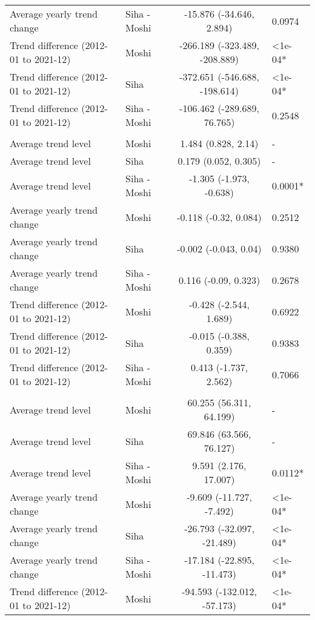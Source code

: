 \begin{longtable}{l|lcl}
Average yearly trend change & Siha - Moshi & -15.876 (-34.646, 2.894) & 0.0974 \\ 
Trend difference (2012-01 to 2021-12) & Moshi & -266.189 (-323.489, -208.889) & <1e-04* \\ 
Trend difference (2012-01 to 2021-12) & Siha & -372.651 (-546.688, -198.614) & <1e-04* \\ 
Trend difference (2012-01 to 2021-12) & Siha - Moshi & -106.462 (-289.689, 76.765) & 0.2548 \\ 
\midrule\addlinespace[2.5pt]
\multicolumn{4}{l}{Leprosy} \\[2.5pt] 
\midrule\addlinespace[2.5pt]
Average trend level & Moshi & 1.484 (0.828, 2.14) & - \\ 
Average trend level & Siha & 0.179 (0.052, 0.305) & - \\ 
Average trend level & Siha - Moshi & -1.305 (-1.973, -0.638) & 0.0001* \\ 
Average yearly trend change & Moshi & -0.118 (-0.32, 0.084) & 0.2512 \\ 
Average yearly trend change & Siha & -0.002 (-0.043, 0.04) & 0.9380 \\ 
Average yearly trend change & Siha - Moshi & 0.116 (-0.09, 0.323) & 0.2678 \\ 
Trend difference (2012-01 to 2021-12) & Moshi & -0.428 (-2.544, 1.689) & 0.6922 \\ 
Trend difference (2012-01 to 2021-12) & Siha & -0.015 (-0.388, 0.359) & 0.9383 \\ 
Trend difference (2012-01 to 2021-12) & Siha - Moshi & 0.413 (-1.737, 2.562) & 0.7066 \\ 
\midrule\addlinespace[2.5pt]
\multicolumn{4}{l}{Malaria} \\[2.5pt] 
\midrule\addlinespace[2.5pt]
Average trend level & Moshi & 60.255 (56.311, 64.199) & - \\ 
Average trend level & Siha & 69.846 (63.566, 76.127) & - \\ 
Average trend level & Siha - Moshi & 9.591 (2.176, 17.007) & 0.0112* \\ 
Average yearly trend change & Moshi & -9.609 (-11.727, -7.492) & <1e-04* \\ 
Average yearly trend change & Siha & -26.793 (-32.097, -21.489) & <1e-04* \\ 
Average yearly trend change & Siha - Moshi & -17.184 (-22.895, -11.473) & <1e-04* \\ 
Trend difference (2012-01 to 2021-12) & Moshi & -94.593 (-132.012, -57.173) & <1e-04* \\ 

\end{longtable}
